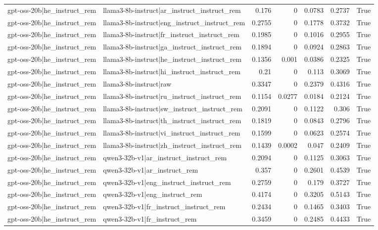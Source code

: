 \begin{table}
\begin{tabular}{l l r r r r l}
gpt-oss-20b|he_instruct_rem & llama3-8b-instruct|ar_instruct_instruct_rem & 0.176 & 0 & 0.0783 & 0.2737 & True \\
gpt-oss-20b|he_instruct_rem & llama3-8b-instruct|eng_instruct_instruct_rem & 0.2755 & 0 & 0.1778 & 0.3732 & True \\
gpt-oss-20b|he_instruct_rem & llama3-8b-instruct|fr_instruct_instruct_rem & 0.1985 & 0 & 0.1016 & 0.2955 & True \\
gpt-oss-20b|he_instruct_rem & llama3-8b-instruct|ga_instruct_instruct_rem & 0.1894 & 0 & 0.0924 & 0.2863 & True \\
gpt-oss-20b|he_instruct_rem & llama3-8b-instruct|he_instruct_instruct_rem & 0.1356 & 0.001 & 0.0386 & 0.2325 & True \\
gpt-oss-20b|he_instruct_rem & llama3-8b-instruct|hi_instruct_instruct_rem & 0.21 & 0 & 0.113 & 0.3069 & True \\
gpt-oss-20b|he_instruct_rem & llama3-8b-instruct|raw & 0.3347 & 0 & 0.2379 & 0.4316 & True \\
gpt-oss-20b|he_instruct_rem & llama3-8b-instruct|ru_instruct_instruct_rem & 0.1154 & 0.0277 & 0.0184 & 0.2124 & True \\
gpt-oss-20b|he_instruct_rem & llama3-8b-instruct|sw_instruct_instruct_rem & 0.2091 & 0 & 0.1122 & 0.306 & True \\
gpt-oss-20b|he_instruct_rem & llama3-8b-instruct|th_instruct_instruct_rem & 0.1819 & 0 & 0.0843 & 0.2796 & True \\
gpt-oss-20b|he_instruct_rem & llama3-8b-instruct|vi_instruct_instruct_rem & 0.1599 & 0 & 0.0623 & 0.2574 & True \\
gpt-oss-20b|he_instruct_rem & llama3-8b-instruct|zh_instruct_instruct_rem & 0.1439 & 0.0002 & 0.047 & 0.2409 & True \\
gpt-oss-20b|he_instruct_rem & qwen3-32b-v1|ar_instruct_instruct_rem & 0.2094 & 0 & 0.1125 & 0.3063 & True \\
gpt-oss-20b|he_instruct_rem & qwen3-32b-v1|ar_instruct_rem & 0.357 & 0 & 0.2601 & 0.4539 & True \\
gpt-oss-20b|he_instruct_rem & qwen3-32b-v1|eng_instruct_instruct_rem & 0.2759 & 0 & 0.179 & 0.3727 & True \\
gpt-oss-20b|he_instruct_rem & qwen3-32b-v1|eng_instruct_rem & 0.4174 & 0 & 0.3205 & 0.5143 & True \\
gpt-oss-20b|he_instruct_rem & qwen3-32b-v1|fr_instruct_instruct_rem & 0.2434 & 0 & 0.1465 & 0.3403 & True \\
gpt-oss-20b|he_instruct_rem & qwen3-32b-v1|fr_instruct_rem & 0.3459 & 0 & 0.2485 & 0.4433 & True \\

\end{tabular}
\end{table}
